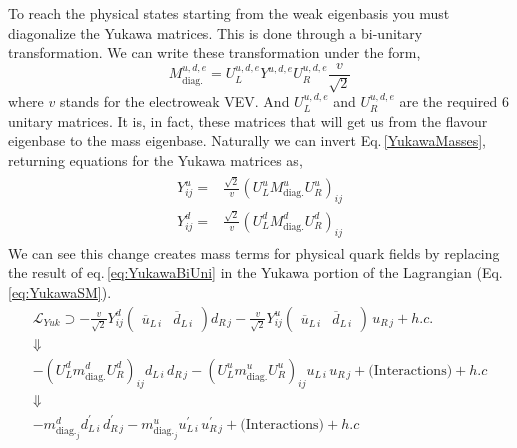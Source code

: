 To reach the physical states starting from the weak eigenbasis you must diagonalize the Yukawa matrices. This is done through a bi-unitary transformation. 
% 
We can write these transformation under the form,
%
\begin{equation}
\label{YukawaMasses} 
M^{u,d,e}_{\text{diag.}}= U^{u,d,e}_L Y^{u,d,e} U^{u,d,e}_R \frac{v}{\sqrt{2}} 
\end{equation} 
%
where $v$ stands for the electroweak VEV. And $U^{u,d,e}_L$ and $U^{u,d,e}_R$ are the required 6 unitary matrices. 
%
{ \color{blue}
It is, in fact, these matrices that will get us from the flavour eigenbase to the mass eigenbase. } 
%
%
%
Naturally we can invert Eq.\,\ref{YukawaMasses}, returning equations for the Yukawa matrices as, 
\begin{align}
\label{eq:YukawaBiUni}
\begin{split}
Y^u_{ij} = & \frac{\sqrt{2}}{v} (U_L^u M^u_{\text{diag.}} U_R^u)_{ij} \\
Y^d_{ij} = & \frac{\sqrt{2}}{v} (U_L^d M^d_{\text{diag.}} U_R^d)_{ij}
\end{split}
\end{align}
%
We can see this change creates mass terms for physical quark fields by replacing the result of eq.\,\ref{eq:YukawaBiUni} in the Yukawa portion of the Lagrangian (Eq.\,\ref{eq:YukawaSM}).
%
\begin{gather}
\mathcal{L}_{Yuk} \supset 
- \frac{v}{\sqrt{2}} Y^d_{ij} \begin{pmatrix} \overline{u}_{L\,i} & \overline{d}_{L\,i}  \end{pmatrix}  d_{R\,j} 
%
-\frac{v}{\sqrt{2}} Y^u_{ij} \begin{pmatrix} \overline{u}_{L\,i} & \overline{d}_{L\,i}  \end{pmatrix} \, u_{R\,j} + h.c. \nonumber  \\ 
 \Downarrow \nonumber \\
-(U_L^d m^d_{\text{diag.}} U_R^d)_{ij} d_{L\,i} \, d_{R\,j}  - (U_L^u m^u_{\text{diag.}} U_R^u)_{ij} u_{L\,i} \, u_{R\,j} + \big(\text{Interactions}\big) + h.c \\ 
 \Downarrow  \nonumber \\ 
-m^d_{\text{diag.}_j} d_{L\,i}^\prime \, d_{R\,j}^\prime  - m^u_{\text{diag.}_j} u_{L\,i}^\prime \, u_{R\,j}^\prime + \big(\text{Interactions}\big) + h.c  \nonumber  
\end{gather}
